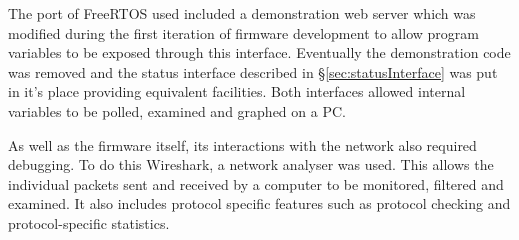 			The port of FreeRTOS used included a demonstration web server which was
			modified during the first iteration of firmware development to allow
			program variables to be exposed through this interface. Eventually the
			demonstration code was removed and the status interface described in
			\S\ref{sec:statusInterface} was put in it's place providing equivalent
			facilities. Both interfaces allowed internal variables to be polled,
			examined and graphed on a PC.
			
			As well as the firmware itself, its interactions with the network also
			required debugging. To do this Wireshark, a network analyser was used.
			This allows the individual packets sent and received by a computer to be
			monitored, filtered and examined. It also includes protocol specific
			features such as protocol checking and protocol-specific
			statistics.
